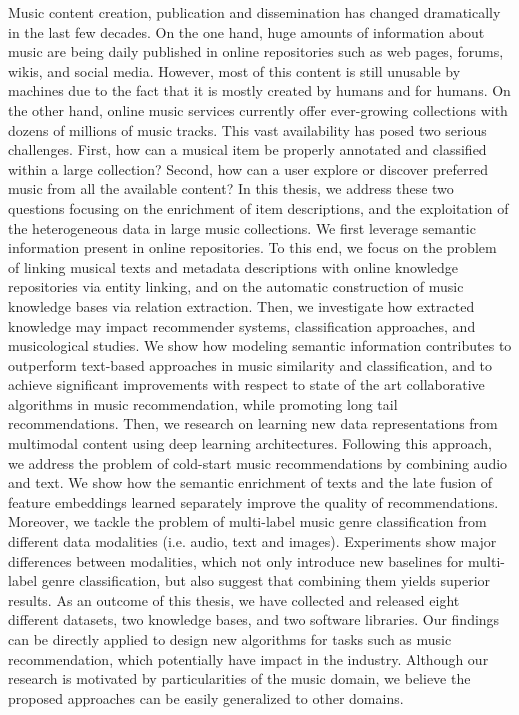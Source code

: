 Music content creation, publication and dissemination has changed dramatically in the last few decades. On the one hand, huge amounts of information about music are being daily published in online repositories such as web pages, forums, wikis, and social media. However, most of this content is still unusable by machines due to the fact that it is mostly created by humans and for humans. On the other hand, online music services currently offer ever-growing collections with dozens of millions of music tracks. This vast availability has posed two serious challenges. First, how can a musical item be properly annotated and classified within a large collection? Second, how can a user explore or discover preferred music from all the available content? In this thesis, we address these two questions focusing on the enrichment of item descriptions, and the exploitation of the heterogeneous data in large music collections. We first leverage semantic information present in online repositories. To this end, we focus on the problem of linking musical texts and metadata descriptions with online knowledge repositories via entity linking, and on the automatic construction of music knowledge bases via relation extraction. Then, we investigate how extracted knowledge may impact recommender systems, classification approaches, and musicological studies. We show how modeling semantic information contributes to outperform text-based approaches in music similarity and classification, and to achieve significant improvements with respect to state of the art collaborative algorithms in music recommendation, while promoting long tail recommendations. Then, we research on learning new data representations from multimodal content using deep learning architectures. Following this approach, we address the problem of cold-start music recommendations by combining audio and text. We show how the semantic enrichment of texts and the late fusion of feature embeddings learned separately improve the quality of recommendations. Moreover, we tackle the problem of multi-label music genre classification from different data modalities (i.e. audio, text and images). Experiments show major differences between modalities, which not only introduce new baselines for multi-label genre classification, but also suggest that combining them yields superior results. As an outcome of this thesis, we have collected and released eight different datasets, two knowledge bases, and two software libraries. Our findings can be directly applied to design new algorithms for tasks such as music recommendation, which potentially have impact in the industry. Although our research is motivated by particularities of the music domain, we believe the proposed approaches can be easily generalized to other domains.
